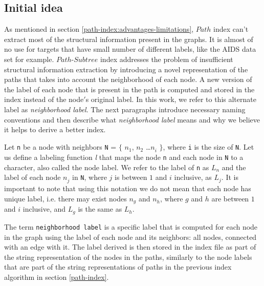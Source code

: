 \documentclass{l4proj}
\theoremstyle{definition}
\begin{document}
\subsection{Initial idea}
As mentioned in section \ref{path-index:advantages-limitations}, $Path$ index can't extract most of the structural information present in the graphs. It is almost of no use for targets that have small number of different labels, like the AIDS data set for example. $Path$-$Subtree$ index addresses the problem of insufficient structural information extraction by introducing a novel representation of the paths that takes into account the neighborhood of each node. A new version of the label of each node that is present in the path is computed and stored in the index instead of the node$'$s original label. In this work, we refer to this alternate label as \textit{neighborhood label}. The next paragraphs introduce necessary naming conventions and then describe what \textit{neighborhood label} means and why we believe it helps to derive a better index.\par %
Let \texttt{n} be a node with neighbors \texttt{N} = $\{$ $n^{}_1$, $n^{}_2$ \ldots $n^{}_i$ $\}$, where \texttt{i} is the size of \texttt{N}. Let us define a labeling function \textit{l} that maps the node \texttt{n} and each node in \texttt{N} to a character, also called the node label. We refer to the label of \texttt{n} as \texttt{$L^{}_n$} and the label of each node $n^{}_j$ in \texttt{N}, where $j$ is between $1$ and $i$ inclusive, as \texttt{$L^{}_j$}. It is important to note that using this notation we do not mean that each node has unique label, i.e. there may exist nodes $n^{}_g$ and $n^{}_h$, where $g$ and $h$ are between $1$ and $i$ inclusive, and \texttt{$L^{}_g$} is the same as \texttt{$L^{}_h$}.\par %
The term \texttt{neighborhood label} is a specific label that is computed for each node in the graph using the label of each node and its neighbors: all nodes, connected with an edge with it. The label derived is then stored in the index file as part of the string representation of the nodes in the paths, similarly to the node labels that are part of the string representations of paths in the previous index algorithm in section \ref{path-index}.\par
\end{document}

